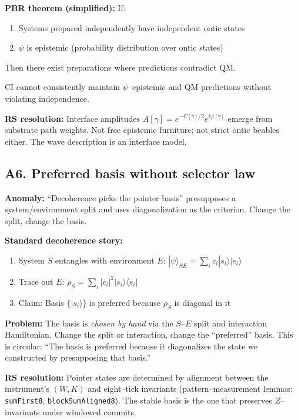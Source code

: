 \documentclass[11pt]{article}
\begin{document}
\textbf{PBR theorem (simplified):} If:
\begin{enumerate}[nosep]
  \item Systems prepared independently have independent ontic states
  \item $\psi$ is epistemic (probability distribution over ontic states)
\end{enumerate}
Then there exist preparations where predictions contradict QM.

CI cannot consistently maintain $\psi$--epistemic and QM predictions without violating independence.

\textbf{RS resolution:} Interface amplitudes $A[\gamma]=e^{-C[\gamma]/2}e^{i\varphi[\gamma]}$ emerge from substrate path weights. Not free epistemic furniture; not strict ontic beables either. The wave description is an interface model.

\subsection{A6. Preferred basis without selector law}

\begin{alertbox}
\textbf{Anomaly:} ``Decoherence picks the pointer basis'' presupposes a system/environment split and uses diagonalization as the criterion. Change the split, change the basis.
\end{alertbox}

\textbf{Standard decoherence story:}
\begin{enumerate}[nosep]
  \item System $S$ entangles with environment $E$: $|\psi\rangle_{SE}=\sum_i c_i |s_i\rangle|e_i\rangle$
  \item Trace out $E$: $\rho_S=\sum_i |c_i|^2 |s_i\rangle\langle s_i|$
  \item Claim: Basis $\{|s_i\rangle\}$ is preferred because $\rho_S$ is diagonal in it
\end{enumerate}

\textbf{Problem:} The basis is \emph{chosen by hand} via the $S$--$E$ split and interaction Hamiltonian. Change the split or interaction, change the ``preferred'' basis. This is circular: ``The basis is preferred because it diagonalizes the state we constructed by presupposing that basis.''

\textbf{RS resolution:} Pointer states are determined by alignment between the instrument's $(W,K)$ and eight--tick invariants (pattern--measurement lemmas: \texttt{sumFirst8}, \texttt{blockSumAligned8}). The stable basis is the one that preserves $Z$--invariants under windowed commits.
\end{document}
